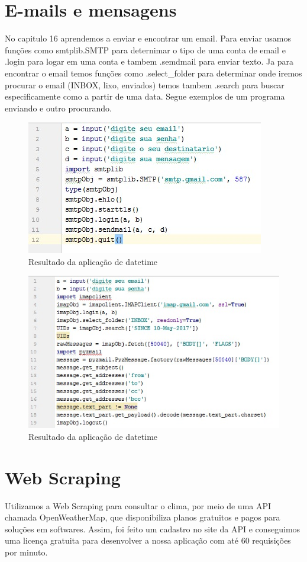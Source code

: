 \documentclass[12pt, a4paper, twocolumn]{article}
\begin{document}
\section{E-mails e mensagens}
No capitulo 16 aprendemos a enviar e encontrar um email. Para enviar usamos funções como smtplib.SMTP para deternimar o tipo de uma conta de email e .login para logar em uma conta e tambem .semdmail para enviar texto. Ja para encontrar o email temos funções como .select\_folder para determinar onde iremos procurar o email (INBOX, lixo, enviados) temos tambem .search para buscar especificamente como a partir de uma data.
Segue exemplos de um programa enviando e outro procurando.
\begin{figure}[htb!]
	\centering
	\includegraphics[scale = 0.5]{envia.jpeg}
	\caption{Resultado da aplicação de datetime }
\end{figure}
\begin{figure}[htb!]
	\centering
	\includegraphics[scale = 0.38]{recebe.jpeg}
	\caption{Resultado da aplicação de datetime }
\end{figure}

\section{Web Scraping}
Utilizamos a Web Scraping para consultar o clima, por meio de uma API chamada OpenWeatherMap, que disponibiliza planos gratuitos e pagos para soluções em softwares. Assim, foi feito um cadastro no site da API e conseguimos uma licença gratuita para desenvolver a nossa aplicação com até 60 requisições por minuto.
\end{document}
